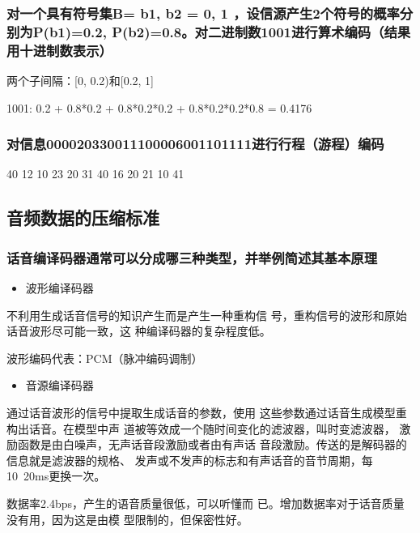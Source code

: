 \documentclass[UTF8,a4paper,AutoFakeBold,AutoFakeSlant]{ctexart}
\begin{document}
\subsubsection{对一个具有符号集B= {b1, b2} = {0, 1} ，设信源产生2个符号的概率分别为P(b1)=0.2, P(b2)=0.8。对二进制数1001进行算术编码（结果用十进制数表示）}

两个子间隔：[0, 0.2)和[0.2, 1]

1001: 0.2 + 0.8*0.2 + 0.8*0.2*0.2 + 0.8*0.2*0.2*0.8 = 0.4176


\subsubsection{对信息000020330011100006001101111进行行程（游程）编码}

40 12 10 23 20 31 40 16 20 21 10 41



\subsection{音频数据的压缩标准}


\subsubsection{话音编译码器通常可以分成哪三种类型，并举例简述其基本原理}

\begin{itemize}
	\item 波形编译码器
\end{itemize}

不利用生成话音信号的知识产生而是产生一种重构信
号，重构信号的波形和原始话音波形尽可能一致，这
种编译码器的复杂程度低。

波形编码代表：PCM（脉冲编码调制）

\begin{itemize}
	\item 音源编译码器
\end{itemize}

通过话音波形的信号中提取生成话音的参数，使用
这些参数通过话音生成模型重构出话音。在模型中声
道被等效成一个随时间变化的滤波器，叫时变滤波器，
激励函数是由白噪声，无声话音段激励或者由有声话
音段激励。传送的是解码器的信息就是滤波器的规格、
发声或不发声的标志和有声话音的音节周期，每
10~20ms更换一次。

数据率2.4bps，产生的语音质量很低，可以听懂而
已。增加数据率对于话音质量没有用，因为这是由模
型限制的，但保密性好。
\end{document}
